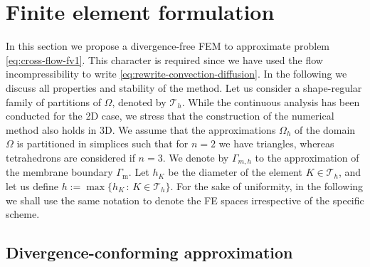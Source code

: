 \documentclass[onefignum,onetabnum,reqno,a4paper,final]{siamart250211}
\def\O{\Omega}
\newcommand\0{\mathbf{0}}
\def\CT{{\mathcal T}}
\renewcommand\O{\Omega}
\newcommand\Gm{\Gamma_{\mathrm{m}}}
\numberwithin{figure}{section}
\numberwithin{table}{section}
\begin{document}
	
	\section{Finite element formulation}\label{sec:fe}
	In this section we propose a divergence-free FEM  to  approximate  problem \eqref{eq:cross-flow-fv1}. This character is required since we have used the flow incompressibility to write \eqref{eq:rewrite-convection-diffusion}. In the following we discuss all properties and stability of the method. Let us consider a shape-regular family of partitions of $\O$, denoted by $\CT_h$. While the continuous analysis has been conducted for the 2D case, we stress that the construction of the numerical method also holds in 3D. We assume that the approximations $\O_h$ of the domain $\O$ is partitioned in simplices such that for $n=2$ we have triangles, whereas tetrahedrons are considered if $n=3$.  We denote by $\Gamma_{m,h}$ to the approximation of the membrane boundary $\Gm$. Let $h_K$ be the diameter of the element $K\in\CT_h$, and let us define $h:=\max\{h_K\,:\, K\in \CT_h\}$. For the sake of uniformity, in the following we shall use the same notation to denote the FE spaces irrespective of the specific scheme.

 
	\subsection{Divergence-conforming approximation}\label{sec:div-conforming}
 
\end{document}
